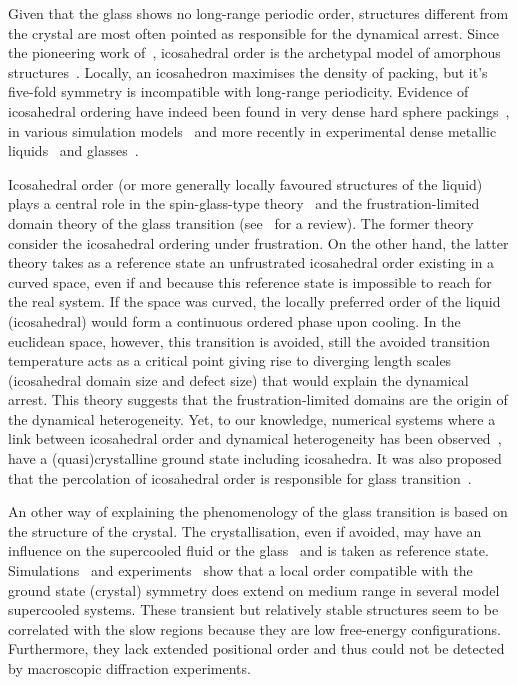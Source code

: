 Given that the glass shows no long-range periodic order, structures different from the crystal are most often pointed as responsible for the dynamical arrest. Since the pioneering work of~\citet{Frank1952}, icosahedral order is the archetypal model of amorphous structures~\citep{Spaepen2000}. Locally, an icosahedron maximises the density of packing, but it's five-fold symmetry is incompatible with long-range periodicity. Evidence of icosahedral ordering have indeed been found in very dense hard sphere packings~\citep{Bernal1960, Clarke1993, Malshe2011}, in various simulation models~\citep{steinhardt1983boo, Tomida1995, Doye2003, Coslovich2007, Pedersen2010, Coslovich2011} and more recently in experimental dense metallic liquids~\citep{Reichert2000, Celino2007} and glasses~\citep{Luo2004, Wang2011}.

Icosahedral order (or more generally locally favoured structures of the liquid) plays a central role in the spin-glass-type theory~\cite{steinhardt1983boo} and the frustration-limited domain theory of the glass transition (see~\citep{tarjus2005fba} for a review). The former theory consider the icosahedral ordering under frustration. On the other hand, the latter theory takes as a reference state an unfrustrated icosahedral order existing in a curved space, even if and because this reference state is impossible to reach for the real system. If the space was curved, the locally preferred order of the liquid (icosahedral) would form a continuous ordered phase upon cooling. In the  euclidean space, however, this transition is avoided, still the avoided transition temperature acts as a critical point giving rise to diverging length scales (icosahedral domain size and defect size) that would explain the dynamical arrest. This theory suggests that the frustration-limited domains are the origin of the dynamical heterogeneity. Yet, to our knowledge, numerical systems where a link between icosahedral order and dynamical heterogeneity has been observed~\citep{Dzugutov2002, Doye2003, Coslovich2007, Pedersen2010, Coslovich2011}, have a (quasi)crystalline ground state including icosahedra. It was also proposed that the percolation of icosahedral order is responsible for glass transition~\cite{Tomida1995}.  

An other way of explaining the phenomenology of the glass transition is based on the structure of the crystal. The crystallisation, even if avoided, may have an influence on the supercooled fluid or the glass~\citep{TanakaGJPCM, Cavagna2003} and is taken as reference state. Simulations~\cite{ShintaniNP,kawasaki2007cbd, Kawasaki2010,tanaka2010critical, Pedersen2010, Coslovich2011} and experiments~\citep{watanabe2008} show that a local order compatible with the ground state (crystal) symmetry does extend on medium range in several model supercooled systems. These transient but relatively stable structures seem to be correlated with the slow regions because they are low free-energy configurations. Furthermore, they lack extended positional order and thus could not be detected by macroscopic diffraction experiments.

